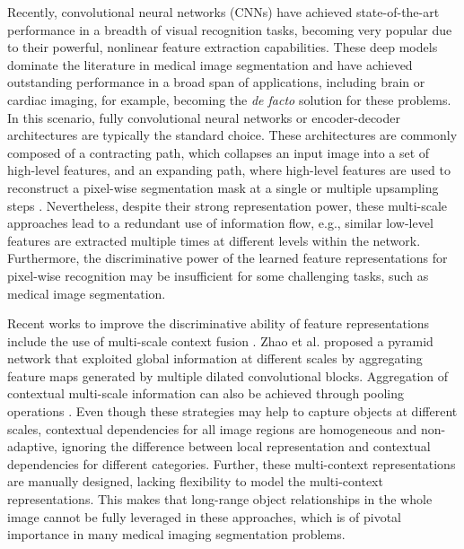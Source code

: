 \documentclass[journal]{IEEEtran}
\begin{document}
Recently, convolutional neural networks (CNNs) have achieved state-of-the-art performance in a breadth of visual recognition tasks, becoming very popular due to their powerful, nonlinear feature extraction capabilities. These deep models dominate the literature in medical image segmentation \cite{litjens2017survey} and have achieved outstanding performance in a broad span of applications, including brain \cite{dolz2018hyperdense} or cardiac \cite{bernard2018deep} imaging, for example, becoming the \textit{de facto} solution for these problems. In this scenario, fully convolutional neural networks \cite{FCN} or encoder-decoder architectures \cite{ronneberger2015u,lin2017refinenet} are typically the standard choice. These architectures are commonly composed of a contracting path, which collapses an input image into a set of high-level features, and an expanding path, where high-level features are used to reconstruct a pixel-wise segmentation mask at a single \cite{FCN} or multiple upsampling steps \cite{ronneberger2015u,lin2017refinenet}. Nevertheless, despite their strong representation power, these multi-scale approaches lead to a redundant use of information flow, e.g., similar low-level features are extracted multiple times at different levels within the network. Furthermore, the discriminative power of the learned feature representations for pixel-wise recognition may be insufficient for some challenging tasks, such as medical image segmentation.

Recent works to improve the discriminative ability of feature representations include the use of multi-scale context fusion \cite{chen2018deeplab,zhao2017pyramid,chen2018encoder,yu2015multi}. Zhao et al. \cite{zhao2017pyramid} proposed a pyramid network that exploited global information at different scales by aggregating feature maps generated by multiple dilated convolutional blocks. Aggregation of contextual multi-scale information can also be achieved through pooling operations \cite{liu2015parsenet}. Even though these strategies may help to capture objects at different scales, contextual dependencies for all image regions are homogeneous and non-adaptive, ignoring the difference between local representation and contextual dependencies for different categories. Further, these multi-context representations are manually designed, lacking flexibility to model the multi-context representations. This makes that long-range object relationships in the whole image cannot be fully leveraged in these approaches, which is of pivotal importance in many medical imaging segmentation problems.   
\end{document}
